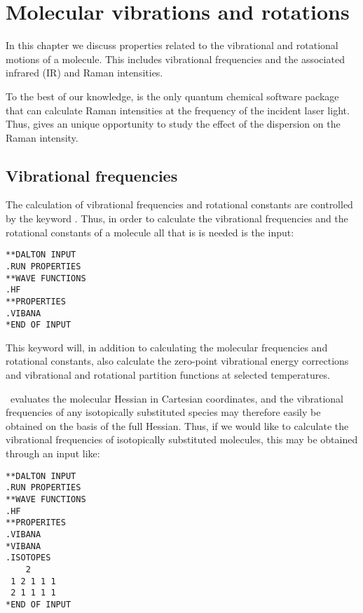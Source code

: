 \chapter{Molecular vibrations and rotations}\label{ch:vibrot}

In this chapter we discuss properties related  to the
vibrational and rotational motions of a molecule. This includes
vibrational frequencies and the associated infrared
(IR) and Raman intensities.

To the best of our knowledge, {\dalton} is the only quantum chemical
software package that can calculate Raman intensities at the frequency
of the incident laser light. Thus, {\dalton} gives an unique
opportunity to study the effect of the dispersion on the Raman
intensity.

\section{Vibrational frequencies}\label{sec:vibfreq}

The calculation of vibrational frequencies and rotational constants are
controlled by the keyword . Thus, in order to
calculate the vibrational frequencies and the rotational constants
of a molecule all that is is needed is the input:

\begin{verbatim}
**DALTON INPUT
.RUN PROPERTIES
**WAVE FUNCTIONS
.HF
**PROPERTIES
.VIBANA
*END OF INPUT
\end{verbatim}

This keyword will, in addition to calculating the molecular frequencies
and rotational constants, also calculate the zero-point vibrational
energy corrections and vibrational
and rotational partition functions
at selected temperatures.

\siraba\ evaluates the molecular Hessian in Cartesian
coordinates, and
the vibrational frequencies of any isotopically substituted  species
may therefore easily be obtained on the basis of the full
Hessian. Thus, if we would like to calculate the vibrational
frequencies of isotopically substituted molecules, this may be obtained through an input like:

\begin{verbatim}
**DALTON INPUT
.RUN PROPERTIES
**WAVE FUNCTIONS
.HF
**PROPERITES
.VIBANA
*VIBANA
.ISOTOPES
    2
 1 2 1 1 1
 2 1 1 1 1
*END OF INPUT
\end{verbatim}

